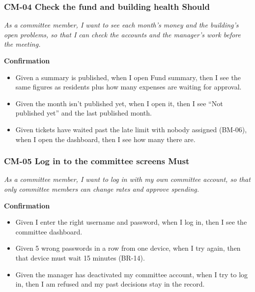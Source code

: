 \documentclass[11pt,a4paper]{report}
\begin{document}
\subsubsection*{CM-04 \textperiodcentered{} Check the fund and building health \textperiodcentered{} Should}

\emph{As a committee member, I want to see each month's money and the building's open problems, so that I can check the accounts and the manager's work before the meeting.}

\medskip\noindent\textbf{Confirmation}\par

\begin{itemize}
  \item Given a summary is published, when I open Fund summary, then I see the same figures as residents plus how many expenses are waiting for approval.
  \item Given the month isn't published yet, when I open it, then I see ``Not published yet'' and the last published month.
  \item Given tickets have waited past the late limit with nobody assigned (BM-06), when I open the dashboard, then I see how many there are.
\end{itemize}

\subsubsection*{CM-05 \textperiodcentered{} Log in to the committee screens \textperiodcentered{} Must}

\emph{As a committee member, I want to log in with my own committee account, so that only committee members can change rates and approve spending.}

\medskip\noindent\textbf{Confirmation}\par

\begin{itemize}
  \item Given I enter the right username and password, when I log in, then I see the committee dashboard.
  \item Given 5 wrong passwords in a row from one device, when I try again, then that device must wait 15 minutes (BR-14).
  \item Given the manager has deactivated my committee account, when I try to log in, then I am refused and my past decisions stay in the record.
\end{itemize}
\end{document}
